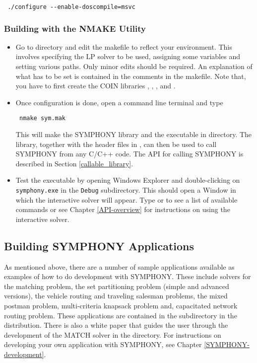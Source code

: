 {\color{Brown}
\begin{verbatim}
 ./configure --enable-doscompile=msvc
\end{verbatim}}

\subsubsection{Building with the NMAKE Utility}
\label{using_nmake}

\begin{itemize}
\item Go to  directory and edit the  
makefile to reflect 
your environment. This involves specifying the LP solver to be used, 
assigning some variables and  setting various paths. Only minor edits 
should be required. An explanation of what has to be set is contained in the 
comments in the makefile.  Note that, you have to first create the COIN 
libraries , , ,  and .

\item Once configuration is done, open a command line terminal and type 
{\color{Brown}
\begin{verbatim}
 nmake sym.mak
\end{verbatim}
}
This will make the SYMPHONY library  and the executable 
 in  directory. The library, together with the 
header files in , can then be used to call 
SYMPHONY from any C/C++ code. The API for calling SYMPHONY is described in 
Section \ref{callable_library}.

\item Test the executable by opening Windows Explorer and double-clicking
on {\color{Brown}\texttt{symphony.exe}} in the
{\color{Brown}\texttt{Debug\bs}} subdirectory. This should open a Window in
which the interactive solver will appear. Type  or  to see
a list of available commands or see Chapter \ref{API-overview} for
instructions on using the interactive solver.

\end{itemize}

\subsection{Building SYMPHONY Applications}
\label{build_appl_msvc}

As mentioned above, there are a number of sample applications available as
examples of how to do development with SYMPHONY. These include solvers for the
matching problem, the set partitioning problem (simple and advanced versions),
the vehicle routing and traveling salesman problems, the mixed postman
problem, multi-criteria knapsack problem and, capacitated network routing
problem. These applications are contained in the 
subdirectory in the distribution. There is also a white paper that guides the
user through the development of the MATCH solver in the 
directory. For instructions on developing your own application with SYMPHONY,
see Chapter \ref{SYMPHONY-development}.

